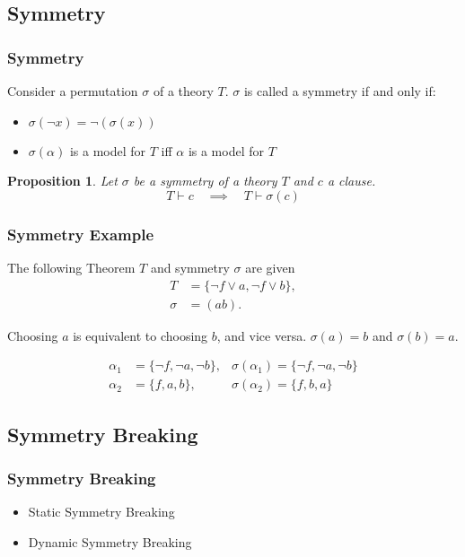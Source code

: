 \documentclass{beamer}
\newtheorem{proposition}{Proposition}
\begin{document}
	\subsection{Symmetry}
	\begin{frame}
		\frametitle{Symmetry}

		\begin{definition}[Symmetry]
			Consider a permutation $\sigma$ of a theory $T$. $\sigma$ is called a symmetry if and only if:
			\begin{itemize}
				\item $\sigma(\neg x) = \neg(\sigma(x))$
				\item $\sigma(\alpha)$ is a model for $T$ iff $\alpha$ is a model for $T$
			\end{itemize}
		\end{definition}

		\pause

		\begin{proposition}
			Let $\sigma$ be a symmetry of a theory $T$ and $c$ a clause.
			\begin{equation}
				T \vdash c \quad \implies \quad T \vdash \sigma( c )
			\end{equation}
		\end{proposition}
	\end{frame}

	\begin{frame}
		\frametitle{Symmetry Example}
		\begin{example}
			The following Theorem $T$ and symmetry $\sigma$ are given
			\begin{align*}
				T &= \{ \neg f \vee a, \neg f \vee b \},\\
				\sigma &= (ab).
			\end{align*}

			Choosing $a$ is equivalent to choosing $b$, and vice versa.
			$\sigma(a) = b$ and $\sigma(b) = a$.

			\begin{align*}
				\alpha_1 &= \{\neg f, \neg a, \neg b\}, &\sigma(\alpha_1 )= \{\neg f, \neg a, \neg b\}\\
				\alpha_2 &= \{f, a, b\}, &\sigma(\alpha_2) = \{f, b, a\}
			\end{align*}
		\end{example}
	\end{frame}

	\subsection{Symmetry Breaking}
	\begin{frame}
		\frametitle{Symmetry Breaking}

		\begin{itemize}
			\item Static Symmetry Breaking
			\item Dynamic Symmetry Breaking
		\end{itemize}
	\end{frame}
\end{document}
